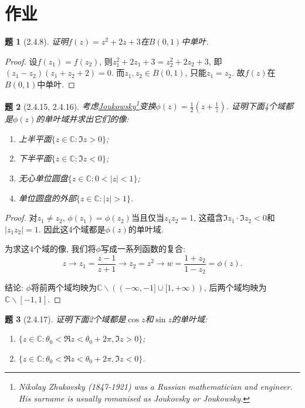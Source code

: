 \documentclass{article}[a4paper, 12pt]
\newtheorem{problem}{题}
\begin{document}
\section{作业}

\begin{problem}[2.4.8]
证明\(f(z)=z^2+2z+3\)在\(B(0,1)\)中单叶.
\end{problem}

\begin{proof}
  设\(f(z_1)=f(z_2)\), 则\(z_1^2+2z_1+3=z_2^2+2z_2+3\), 即\((z_1-z_2)(z_1+z_2+2)=0\). 而\(z_1,z_2\in B(0,1)\), 只能\(z_1=z_2\). 故\(f(z)\)在\(B(0,1)\)中单叶.
\end{proof}

\begin{problem}[2.4.15, 2.4.16]
  考虑\href{https://en.wikipedia.org/wiki/Joukowsky_transform}{Joukowsky\footnote{Nikolay Zhukovsky (1847-1921) was a Russian mathematician and engineer. His surname is usually romanised as Joukovsky or Joukowsky.}变换}\(\phi(z)=\frac12\left(z+\frac1z\right)\). 证明下面4个域都是\(\phi(z)\)的单叶域并求出它们的像:
  \begin{enumerate}
    \item 上半平面\(\{z\in\mathbb{C}:\Im z>0\}\);
    \item 下半平面\(\{z\in\mathbb{C}:\Im z<0\}\);
    \item 无心单位圆盘\(\{z\in\mathbb{C}:0<|z|<1\}\);
    \item 单位圆盘的外部\(\{z\in\mathbb{C}:|z|>1\}\).
  \end{enumerate}
\end{problem}

\begin{proof}
  对\(z_1\ne z_2\), \(\phi(z_1)=\phi(z_2)\)当且仅当\(z_1z_2=1\), 这蕴含\(\Im z_1\cdot\Im z_2<0\)和\(|z_1z_2|=1\). 因此这4个域都是\(\phi(z)\)的单叶域. 

  为求这4个域的像, 我们将\(\phi\)写成一系列函数的复合:
  \[z\longrightarrow z_1=\frac{z-1}{z+1}\longrightarrow z_2=z^2\longrightarrow w=\frac{1+z_2}{1-z_2}=\phi(z).\]

  结论: \(\phi\)将前两个域均映为\(\mathbb{C}\backslash((-\infty,-1]\cup[1,+\infty))\), 后两个域均映为\(\mathbb{C}\backslash[-1,1]\).
\end{proof}

\begin{problem}[2.4.17]
  证明下面2个域都是\(\cos z\)和\(\sin z\)的单叶域:
  \begin{enumerate}
    \item \(\{z\in\mathbb C:\theta_0<\Re z<\theta_0+2\pi, \Im z>0\}\);
    \item \(\{z\in\mathbb C:\theta_0<\Re z<\theta_0+2\pi, \Im z<0\}\).
  \end{enumerate}
\end{problem}
\end{document}
